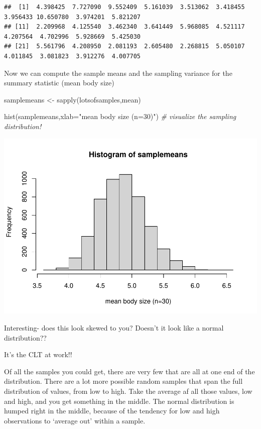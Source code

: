 \documentclass[
]{article}
\newenvironment{Shaded}{\begin{snugshade}}{\end{snugshade}}
\newcommand{\AttributeTok}[1]{\textcolor[rgb]{0.77,0.63,0.00}{#1}}
\newcommand{\CommentTok}[1]{\textcolor[rgb]{0.56,0.35,0.01}{\textit{#1}}}
\newcommand{\FunctionTok}[1]{\textcolor[rgb]{0.00,0.00,0.00}{#1}}
\newcommand{\NormalTok}[1]{#1}
\newcommand{\OtherTok}[1]{\textcolor[rgb]{0.56,0.35,0.01}{#1}}
\newcommand{\StringTok}[1]{\textcolor[rgb]{0.31,0.60,0.02}{#1}}
\begin{document}
\begin{verbatim}
##  [1]  4.398425  7.727090  9.552409  5.161039  3.513062  3.418455  3.956433 10.650780  3.974201  5.821207
## [11]  2.209968  4.125540  3.462340  3.641449  5.968085  4.521117  4.207564  4.702996  5.928669  5.425030
## [21]  5.561796  4.208950  2.081193  2.605480  2.268815  5.050107  4.011845  3.081823  3.912276  4.007705
\end{verbatim}

Now we can compute the sample means and the sampling variance for the
summary statistic (mean body size)

\begin{Shaded}
\begin{Highlighting}[]
\NormalTok{samplemeans }\OtherTok{\textless{}{-}} \FunctionTok{sapply}\NormalTok{(lotsofsamples,mean)}

\FunctionTok{hist}\NormalTok{(samplemeans,}\AttributeTok{xlab=}\StringTok{"mean body size (n=30)"}\NormalTok{)    }\CommentTok{\# visualize the sampling distribution!}
\end{Highlighting}
\end{Shaded}

\includegraphics{LECTURE2_files/figure-latex/unnamed-chunk-7-1.pdf}

Interesting- does this look skewed to you? Doesn't it look like a normal
distribution??

It's the CLT at work!!

Of all the samples you could get, there are very few that are all at one
end of the distribution. There are a lot more possible random samples
that span the full distribution of values, from low to high. Take the
average af all those values, low and high, and you get something in the
middle. The normal distribution is humped right in the middle, because
of the tendency for low and high observations to `average out' within a
sample.
\end{document}
